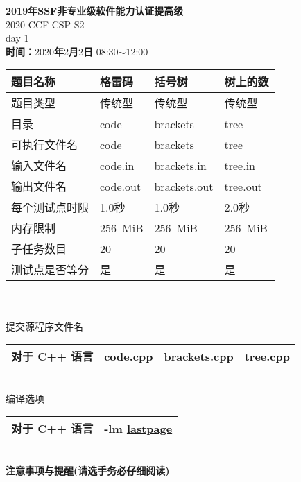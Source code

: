 \documentclass[11pt, a4paper, UTF8]{ctexart}
\begin{document}
    \setcounter{page}{1}
    \begin{center}
       \fontsize{23pt}{\baselineskip}
        \textbf{2019年SSF非专业级软件能力认证提高级}
        \Large\\2020 CCF CSP-S2\\day 1\\
        \textbf{时间：}2020\textbf{年}2\textbf{月}2\textbf{日} 08:30$\sim$12:00
    \end{center}
    \fontsize{11pt}{\baselineskip}
    \begin{tabular}{|p{4cm}|p{2.5cm}|p{2.5cm}|p{2.5cm}|} \hline  
        题目名称 & 格雷码 & 括号树 & 树上的数 \\ \hline  
        题目类型 & 传统型 & 传统型 & 传统型  \\ \hline  
        目录 & \textsf{code} & \textsf{brackets} & \textsf{tree} \\ \hline
        可执行文件名 & \textsf{code} & \textsf{brackets} & \textsf{tree} \\ \hline
        输入文件名 & \textsf{code.in} & \textsf{brackets.in} & \textsf{tree.in} \\ \hline
        输出文件名 & \textsf{code.out} & \textsf{brackets.out} & \textsf{tree.out} \\ \hline
        每个测试点时限 & 1.0秒 & 1.0秒 & 2.0秒 \\ \hline
        内存限制 & 256\ MiB & 256\ MiB & 256\ MiB \\ \hline
        子任务数目 & 20 & 20 & 20 \\ \hline
        测试点是否等分 & 是 & 是 & 是 \\ \hline
    \end{tabular}
    \\\\提交源程序文件名\\
    \begin{tabular}{|p{4cm}|p{2.5cm}|p{2.5cm}|p{2.5cm}|} \hline  
        对于 C++ 语言 & \textsf{code.cpp} & \textsf{brackets.cpp} & \textsf{tree.cpp} \\ \hline
    \end{tabular}
    \\编译选项\\
    \begin{tabular}{|p{4cm}|p{8.275cm}|} \hline  
        对于 C++ 语言 & -lm \hyperref[lastpage]{lastpage} \\ \hline
    \end{tabular}
    \small
    \textbf{\\注意事项与提醒(请选手务必仔细阅读)\\}
\end{document}
